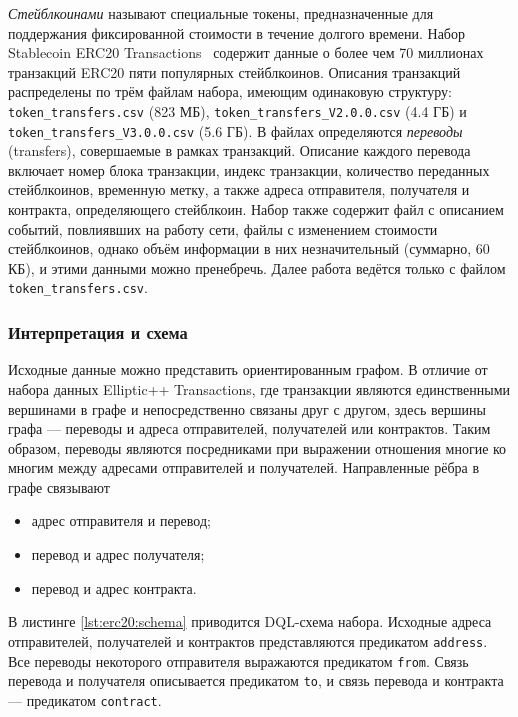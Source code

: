 \textit{Стейблкоинами} называют специальные токены, предназначенные для поддержания фиксированной стоимости в течение
долгого времени. Набор Stablecoin ERC20 Transactions~\cite{erc20} содержит данные о более чем 70 миллионах транзакций
ERC20 пяти популярных стейблкоинов. Описания транзакций распределены по трём файлам набора, имеющим одинаковую
структуру: \texttt{token\_transfers.csv} (823 МБ), \texttt{token\_transfers\_V2.0.0.csv} (4.4 ГБ) и
\texttt{token\_transfers\_V3.0.0.csv} (5.6 ГБ). В файлах определяются \textit{переводы} (transfers), совершаемые в
рамках транзакций. Описание каждого перевода включает номер блока транзакции, индекс транзакции, количество переданных
стейблкоинов, временную метку, а также адреса отправителя, получателя и контракта, определяющего стейблкоин. Набор
также содержит файл с описанием событий, повлиявших на работу сети, файлы с изменением стоимости стейблкоинов, однако
объём информации в них незначительный (суммарно, 60 КБ), и этими данными можно пренебречь. Далее работа ведётся только с
файлом \texttt{token\_transfers.csv}.

\subsubsection{Интерпретация и схема}

Исходные данные можно представить ориентированным графом. В отличие от набора данных Elliptic++ Transactions, где
транзакции являются единственными вершинами в графе и непосредственно связаны друг с другом, здесь вершины графа ---
переводы и адреса отправителей, получателей или контрактов. Таким образом, переводы являются посредниками при выражении
отношения многие ко многим между адресами отправителей и получателей. Направленные рёбра в графе связывают
\begin{itemize}
  \item адрес отправителя и перевод;
  \item перевод и адрес получателя;
  \item перевод и адрес контракта.
\end{itemize}
В листинге \ref{lst:erc20:schema} приводится DQL-схема набора. Исходные адреса отправителей, получателей и контрактов
представляются предикатом \texttt{address}. Все переводы некоторого отправителя выражаются предикатом \texttt{from}.
Связь перевода и получателя описывается предикатом \texttt{to}, и связь перевода и контракта --- предикатом
\texttt{contract}.


